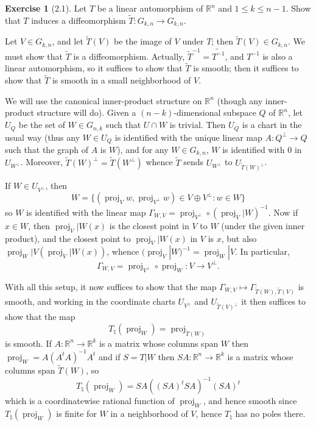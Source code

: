 \documentclass[10pt]{article}
\newcommand{\RR}{\mathbb{R}}
\DeclareMathOperator{\proj}{proj}
\theoremstyle{definition}
\newtheorem{exer}{Exercise}
\begin{document}
\begin{exer}[2.1]
Let $T$ be a linear automorphism of $\RR^n$ and $1 \leq k \leq n - 1$. Show that $T$ induces a diffeomorphism $\tilde T: G_{k,n} \to G_{k,n}$.
\end{exer}

Let $V \in G_{k,n}$, and let $\tilde T(V)$ be the image of $V$ under $T$; then $\tilde T(V) \in G_{k,n}$.
We must show that $\tilde T$ is a diffeomorphism. Actually, $\tilde T^{-1} = \widetilde{T^{-1}}$, and $T^{-1}$ is also a linear automorphism, so it suffices to show that $\tilde T$ is smooth; then it suffices to show that $\tilde T$ is smooth in a small neighborhood of $V$.

We will use the canonical inner-product structure on $\RR^n$ (though any inner-product structure will do).
Given a $(n-k)$-dimensional subspace $Q$ of $\RR^n$, let $U_Q$ be the set of $W \in G_{n,k}$ such that $U \cap W$ is trivial.
Then $U_Q$ is a chart in the usual way (thus any $W \in U_Q$ is identified with the unique linear map $A: Q^\perp \to Q$ such that the graph of $A$ is $W$), and for any $W \in G_{k,n}$, $W$ is identified with $0$ in $U_{W^\perp}$.
Moreover, $\tilde T(W)^\perp = \tilde T(W^\perp)$ whence $\tilde T$ sends $U_{W^\perp}$ to $U_{\tilde T(W)^\perp}$.

If $W \in U_{V^\perp}$, then
$$W = \{(\proj_Vw, \proj_{V^\perp}w) \in V \oplus V^\perp: w \in W\}$$
so $W$ is identified with the linear map $\Gamma_{W,V} = \proj_{V^\perp} \circ (\proj_V|W)^{-1}$.
Now if $x \in W$, then $\proj_V|W(x)$ is the closest point in $V$ to $W$ (under the given inner product), and the closest point to $\proj_V|W(x)$ in $V$ is $x$, but also $\proj_W|V(\proj_V|W(x))$, whence $(\proj_V|W)^{-1} = \proj_W|V$. In particular,
$$\Gamma_{W,V} = \proj_{V^\perp} \circ \proj_W: V \to V^\perp.$$

With all this setup, it now suffices to show that the map $\Gamma_{W,V} \mapsto \Gamma_{\tilde T(W),\tilde T(V)}$ is smooth, and working in the coordinate charts $U_{V^\perp}$ and $U_{\tilde T(V)^\perp}$ it then suffices to show that the map
$$T_\natural(\proj_W) = \proj_{\tilde T(W)}$$
is smooth. If $A: \RR^n \to \RR^k$ is a matrix whose columns span $W$ then $\proj_W = A(A^tA)^{-1}A^t$ and if $S = T|W$ then $SA: \RR^n \to \RR^k$ is a matrix whose columns span $\tilde T(W)$, so
$$T_\natural(\proj_W) = SA((SA)^tSA)^{-1}(SA)^t$$
which is a coordinatewise rational function of $\proj_W$, and hence smooth since $T_\natural(\proj_W)$ is finite for $W$ in a neighborhood of $V$, hence $T_\natural$ has no poles there.
\end{document}
